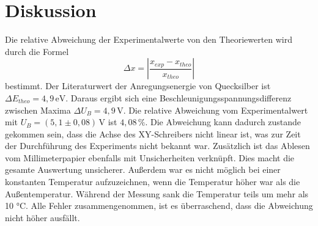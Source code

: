 \section{Diskussion}
\label{sec:Diskussion}
Die relative Abweichung der Experimentalwerte von 
den Theoriewerten wird durch die Formel 
$$\Delta x = \left|\frac{x_{exp} - x_{theo}}{x_{theo}} \right|$$
bestimmt. 
Der Literaturwert der Anregungsenergie von Quecksilber 
ist $\Delta E_{theo} = 4,9 \, \unit{\eV}$. Daraus ergibt 
sich eine Beschleunigungsspannungsdifferenz zwischen Maxima 
$\Delta U_B = 4,9 \, \unit{\volt}$. Die relative Abweichung 
vom Experimentalwert mit $U_B = (5,1 \pm 0,08)\,\unit{\volt}$ ist $4,08 \, \%$. 
Die Abweichung kann dadurch zustande gekommen sein, dass die Achse des XY-Schreibers
nicht linear ist, was zur Zeit der Durchführung des Experiments nicht bekannt war. 
Zusätzlich ist das Ablesen 
vom Millimeterpapier ebenfalls mit Unsicherheiten verknüpft. 
Dies macht die gesamte Auswertung unsicherer. Außerdem war es nicht 
möglich bei einer konstanten Temperatur aufzuzeichnen, wenn die Temperatur 
höher war als die Außentemperatur. Während der Messung sank die Temperatur 
teils um mehr als 10 °C. Alle Fehler zusammengenommen, ist es überraschend, 
dass die Abweichung nicht höher ausfällt.